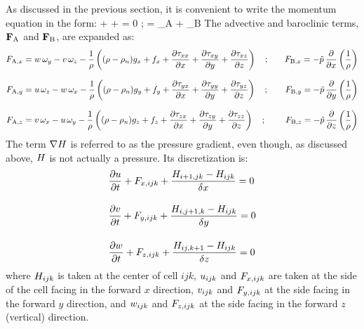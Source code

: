 As discussed in the previous section, it is convenient to write the momentum equation in the form:
\be
    + \bF + \nabla \cH = 0 \quad ; \quad \bF = \bF_{\rm A} + \bF_{\rm B} \label{simple_momentum_equation}
\ee
The advective and baroclinic terms, ${\mathbf{F}}_{\rm A}$ and ${\mathbf{F}}_{\rm B}$, are expanded as:
\begin{align}
F_{{\rm A},x} &= w \, \omega_y - v \, \omega_z  - \frac{1}{\rho} \left( (\rho-\rho_n)g_x + f_x  +  \frac{\partial \tau_{xx}}{\partial x} + \frac{\partial \tau_{xy}}{\partial y} + \frac{\partial \tau_{xz}}{\partial z} \right) \quad ; \quad & F_{{\rm B},x} = -\tilde{p} \, \frac{\partial }{\partial x} \left( \frac{1}{\rho} \right) \\[0.1in]
F_{{\rm A},y} &= u \, \omega_z - w \, \omega_x  - \frac{1}{\rho} \left( (\rho-\rho_n)g_y + f_y  +  \frac{\partial \tau_{yx}}{\partial x} + \frac{\partial \tau_{yy}}{\partial y} + \frac{\partial \tau_{yz}}{\partial z} \right) \quad ; \quad & F_{{\rm B},y} = -\tilde{p} \, \frac{\partial }{\partial y} \left( \frac{1}{\rho} \right) \\[0.1in]
F_{{\rm A},z} &= v \, \omega_x - u \, \omega_y  - \frac{1}{\rho} \left( (\rho-\rho_n)g_z + f_z  +  \frac{\partial \tau_{zx}}{\partial x} + \frac{\partial \tau_{zy}}{\partial y} + \frac{\partial \tau_{zz}}{\partial z} \right) \quad ; \quad & F_{{\rm B},z} = -\tilde{p} \, \frac{\partial }{\partial z} \left( \frac{1}{\rho} \right)
\end{align}
The term $\nabla H$ is referred to as the pressure gradient, even though, as discussed above, $H$ is not actually a pressure. Its discretization is:
\begin{align}
&\frac{\partial u}{\partial t} + F_{x,ijk} + \frac{H_{i+1,jk} -H_{ijk}}{\delta x}  = 0  \label{umom} \\[0.15in]
&\frac{\partial v}{\partial t} + F_{y,ijk} + \frac{H_{i,j+1,k}-H_{ijk}}{\delta y}  = 0  \label{vmom} \\[0.15in]
&\frac{\partial w}{\partial t} + F_{z,ijk} + \frac{H_{ij,k+1} -H_{ijk}}{\delta z}  = 0  \label{wmom}
\end{align}
where $H_{ijk}$ is taken at the center of cell $ijk$, $u_{ijk}$ and $F_{x,ijk}$ are taken at the side of the cell facing in the forward $x$ direction, $v_{ijk}$ and $F_{y,ijk}$ at the side facing in the forward $y$ direction, and $w_{ijk}$ and $F_{z,ijk}$ at the side facing in the forward $z$ (vertical) direction.

